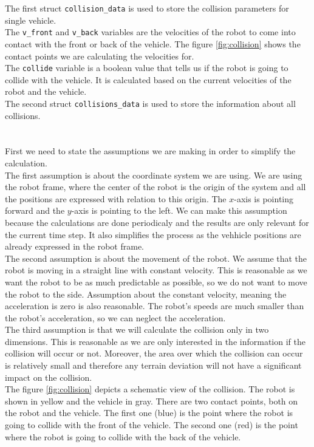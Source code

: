         The first struct \texttt{collision\_data} is used to store the collision parameters for single vehicle.\\
        The \texttt{v\_front} and \texttt{v\_back} variables are the velocities of the robot to come into contact with the front or back of the vehicle. The figure \ref{fig:collision} shows the contact points we are calculating the velocities for.\\
        The \texttt{collide} variable is a boolean value that tells us if the robot is going to collide with the vehicle. It is calculated based on the current velocities of the robot and the vehicle.\\
        The second struct \texttt{collisions\_data} is used to store the information about all collisions.\\\\
    \\
        First we need to state the assumptions we are making in order to simplify the calculation.\\
        The first assumption is about the coordinate system we are using. We are using the robot frame, where the center of the robot is the origin of the system and all the positions are expressed with relation to this origin. The $x$-axis is pointing forward and the $y$-axis is pointing to the left. We can make this assumption because the calculations are done periodicaly and the results are only relevant for the current time step. It also simplifies the process as the vehhicle positions are already expressed in the robot frame.\\
        The second assumption is about the movement of the robot. We assume that the robot is moving in a straight line with constant velocity. This is reasonable as we want the robot to be as much predictable as possible, so we do not want to move the robot to the side. Assumption about the constant velocity, meaning the acceleration is zero is also reasonable. The robot's speeds are much smaller than the robot's acceleration, so we can neglect the acceleration.\\
        The third assumption is that we will calculate the collision only in two dimensions. This is reasonable as we are only interested in the information if the collision will occur or not. Moreover, the area over which the collision can occur is relatively small and therefore any terrain deviation will not have a significant impact on the collision.\\
        The figure \ref{fig:collision} depicts a schematic view of the collision. The robot is shown in yellow and the vehicle in gray. There are two contact points, both on the robot and the vehicle. The first one (blue) is the point where the robot is going to collide with the front of the vehicle. The second one (red) is the point where the robot is going to collide with the back of the vehicle.\\
